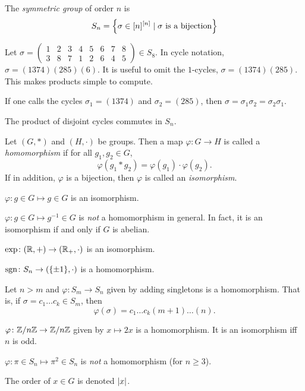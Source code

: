 \begin{definition} \label{def:s_n}
    The \emph{symmetric group} of order $n$ is \[
        S_n = \set{\sigma \in [n]^{[n]} \mid \sigma \text{ is a bijection}}
    \]
\end{definition}
\begin{example}
    Let $\sigma = \begin{pmatrix}
        1 & 2 & 3 & 4 & 5 & 6 & 7 & 8 \\
        3 & 8 & 7 & 1 & 2 & 6 & 4 & 5
    \end{pmatrix} \in S_8$.
    In cycle notation, $\sigma = (1374)(285)(6)$.
    It is useful to omit the $1$-cycles, $\sigma = (1374)(285)$.
    This makes products simple to compute.

    If one calls the cycles $\sigma_1 = (1374)$ and $\sigma_2 = (285)$,
    then $\sigma = \sigma_1 \sigma_2 = \sigma_2 \sigma_1$.
\end{example}
\begin{exercise}
    The product of disjoint cycles commutes in $S_n$.
\end{exercise}

\begin{definition}[Morphisms] \label{def:grouphism}
    Let $(G, *)$ and $(H, \cdot)$ be groups.
    Then a map $\varphi\colon G \to H$
    is called a \emph{homomorphism} if for all $g_1, g_2 \in G$, \[
        \varphi(g_1 * g_2) = \varphi(g_1) \cdot \varphi(g_2).
    \] If in addition, $\varphi$ is a bijection, then $\varphi$ is called an
    \emph{isomorphism}.
\end{definition}
\begin{examples}
    \item $\varphi\colon g \in G \mapsto g \in G$ is an isomorphism.
    \item $\varphi\colon g \in G \mapsto g^{-1} \in G$ is \emph{not} a
    homomorphism in general.
    In fact, it is an isomorphism if and only if $G$ is abelian.
    \item $\exp\colon (\mathbb{R}, +) \to (\mathbb{R}_+, \cdot)$ is an isomorphism.
    \item $\sgn\colon S_n \to (\set{\pm 1}, \cdot)$ is a homomorphism.
    \item Let $n > m$ and $\varphi\colon S_m \to S_n$ given by adding
    singletons is a homomorphism.
    That is, if $\sigma = c_1 \dots c_k \in S_m$, then \[
        \varphi(\sigma) = c_1 \dots c_k (m+1) \dots (n).
    \]
    \item $\varphi\colon \mathbb{Z}/n\mathbb{Z} \to \mathbb{Z}/n\mathbb{Z}$ given by $x \mapsto 2x$ is a
    homomorphism.
    It is an isomorphism iff $n$ is odd.
    \item $\varphi\colon \pi \in S_n \mapsto \pi^2 \in S_n$ is \emph{not}
    a homomorphism (for $n \geq 3$).
\end{examples}
\begin{notation}
    The order of $x \in G$ is denoted $\abs{x}$.
\end{notation}

